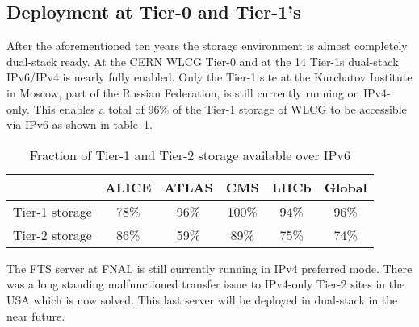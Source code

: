 
%
\subsection{Deployment at Tier-0 and Tier-1's}
After the aforementioned ten years the storage environment is almost completely dual-stack ready. At the CERN WLCG Tier-0 and at the 14 Tier-1s dual-stack IPv6/IPv4 is nearly fully enabled. Only the Tier-1 site at the Kurchatov Institute in Moscow, part of the Russian Federation, is still currently running on IPv4-only. This enables a total of 96\% of the Tier-1 storage of WLCG to be accessible via IPv6 as shown in table~\ref{tab:t012stor}.
\begin{table}[h]
\centering
\caption{Fraction of Tier-1 and Tier-2 storage available over IPv6}
\label{tab:t012stor}
\begin{tabular}{lccccc}
\hline
& ALICE & ATLAS & CMS & LHCb & Global \\\hline
Tier-1 storage & 78\% & 96\% & 100\% & 94\% & 96\% \\
Tier-2 storage & 86\% & 59\% &  89\% & 75\% & 74\% \\\hline
\end{tabular}
\end{table}

The FTS server at FNAL is still currently running in IPv4 preferred mode. There was a long standing malfunctioned transfer issue to IPv4-only Tier-2 sites in the USA which is now solved. This last server will be deployed in dual-stack in the near future.
